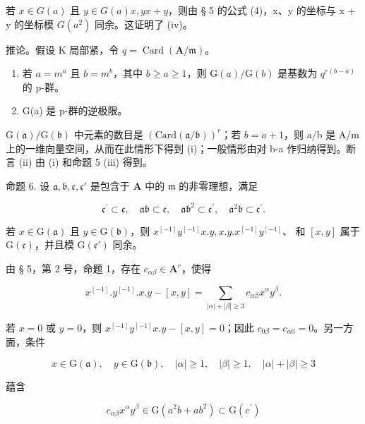 若 \(x \in G(a)\) 且 \(y \in G(a)\)\(x, y\)\(x + y\)，则由 § 5 的公式 (4)，x、y 的坐标与 x + y 的坐标模 \(G(a^2)\) 同余。这证明了 (iv)。

推论。假设 K 局部紧，令 \(q = \operatorname{Card}(\mathbf{A} / \mathfrak{m})\)。

\begin{enumerate}
\def\labelenumi{(\roman{enumi})}
\item
  若 \(a = m^{a}\) 且 \(b = m^{b}\)，其中 \(b \geqslant a \geqslant 1\)，则 \(\mathrm{G}(a)/\mathrm{G}(b)\) 是基数为 \(q^{r(b-a)}\) 的 p-群。
\item
  G(a) 是 p-群的逆极限。
\end{enumerate}

\(\mathrm{G}(\mathfrak{a})/\mathrm{G}(\mathfrak{b})\) 中元素的数目是 \((\mathrm{Card}(\mathfrak{a}/\mathfrak{b}))^{r}\)；若 \(b=a+1\)，则 a/b 是 A/m 上的一维向量空间，从而在此情形下得到 (i)；一般情形由对 b-a 作归纳得到。断言 (ii) 由 (i) 和命题 5 (iii) 得到。

命题 6. 设 \(\mathfrak{a}, \mathfrak{b}, \mathfrak{c}, \mathfrak{c}'\) 是包含于 \(\mathbf{A}\) 中的 \(\mathfrak{m}\) 的非零理想，满足

\[
\mathfrak {c} ^ {\prime} \subset \mathfrak {c}, \quad \mathfrak {a b} \subset \mathfrak {c}, \quad \mathfrak {a b} ^ {2} \subset \mathfrak {c} ^ {\prime}, \quad \mathfrak {a} ^ {2} \mathfrak {b} \subset \mathfrak {c} ^ {\prime}.
\]

若 \(x \in \mathrm{G}(\mathfrak{a})\) 且 \(y \in \mathrm{G}(\mathfrak{b})\)，则 \(x^{[-1]}y^{[-1]}x.y, x.y.x^{[-1]}y^{[-1]}\)、 和 \([x,y]\) 属于 \(\mathrm{G}(\mathfrak{c})\)，并且模 \(\mathrm{G}(\mathfrak{c}')\) 同余。

由 § 5，第 2 号，命题 1，存在 \(c_{\alpha \beta} \in \mathbf{A}^r\)，使得

\[
x ^ {[ - 1 ]}. y ^ {[ - 1 ]}. x. y - [ x, y ] = \sum_ {| \alpha | + | \beta | \geqslant 3} c _ {\alpha \beta} x ^ {\alpha} y ^ {\beta}.
\]

若 \(x = 0\) 或 \(y = 0\)，则 \(x^{[-1]}y^{[-1]}x.y - [x,y] = 0\)；因此 \(c_{0\beta} = c_{\alpha 0} = 0\)。另一方面，条件

\[
x \in \mathrm{G} (\mathfrak {a}), \quad y \in \mathrm{G} (\mathfrak {b}), \quad | \alpha | \geqslant 1, \quad | \beta | \geqslant 1, \quad | \alpha | + | \beta | \geqslant 3
\]

蕴含

\[
c _ {\alpha \beta} x ^ {\alpha} y ^ {\beta} \in \mathrm{G} (a ^ {2} b + a b ^ {2}) \subset \mathrm{G} (c ^ {\prime})
\]

